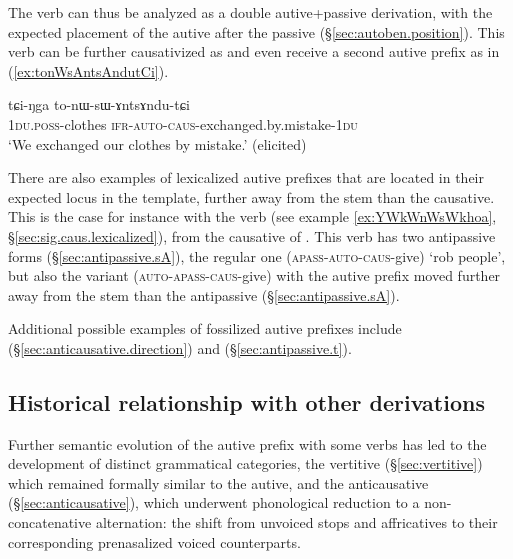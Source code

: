The verb  can thus be analyzed as a double autive+passive derivation, with the expected placement of the autive after the passive (§\ref{sec:autoben.position}). This verb can be further causativized as  and even receive a second autive prefix as in (\ref{ex:tonWsAntsAndutCi}).

\begin{exe}
\ex \label{ex:tonWsAntsAndutCi}
\gll tɕi-ŋga to-nɯ-sɯ-ɤntsɤndu-tɕi \\
\textsc{1du}.\textsc{poss}-clothes \textsc{ifr}-\textsc{auto}-\textsc{caus}-exchanged.by.mistake-\textsc{1du} \\
\glt `We exchanged our clothes by mistake.' (elicited)
\end{exe}

There are also examples of lexicalized autive  prefixes that are located in their expected locus in the template, further away from the stem than the causative. This is the case for instance with the verb  (see example \ref{ex:YWkWnWsWkhoa}, §\ref{sec:sig.caus.lexicalized}), from the causative  of . This verb has two  antipassive forms (§\ref{sec:antipassive.sA}), the regular one  (\textsc{apass}-\textsc{auto}-\textsc{caus}-give) `rob people', but also the variant  (\textsc{auto}-\textsc{apass}-\textsc{caus}-give) with the autive prefix   moved further away from the stem than the antipassive  (§\ref{sec:antipassive.sA}).

Additional possible examples of fossilized autive prefixes include  (§\ref{sec:anticausative.direction}) and  (§\ref{sec:antipassive.t}).

\subsection{Historical relationship with other derivations} \label{sec:autoben.historical}
Further semantic evolution of the autive prefix with some verbs has led to the development of distinct grammatical categories, the vertitive  (§\ref{sec:vertitive}) which remained formally similar to the autive, and the anticausative (§\ref{sec:anticausative}), which underwent phonological reduction to a non-concatenative alternation: the shift from unvoiced stops and affricatives to their corresponding prenasalized voiced counterparts.
 
